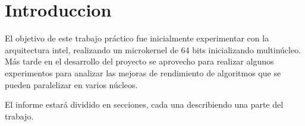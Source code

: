 \section{Introduccion}
    El objetivo de este trabajo práctico fue inicialmente experimentar con la arquitectura intel, realizando un microkernel de 64 bits inicializando multinúcleo. Más tarde en el desarrollo del proyecto se aprovecho para realizar algunos experimentos para analizar las mejoras de rendimiento de algoritmos que se pueden paralelizar en varios núcleos.

    El informe estará dividido en secciones, cada una describiendo una parte del trabajo.
